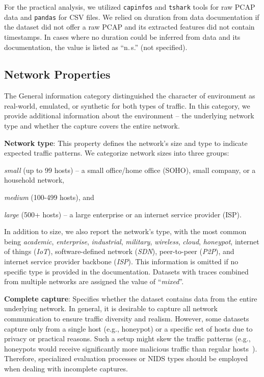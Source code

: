 For the practical analysis, we utilized \texttt{capinfos} and \texttt{tshark} tools for raw PCAP data and \texttt{pandas} for CSV files. We relied on duration from data documentation if the dataset did not offer a raw PCAP and its extracted features did not contain timestamps. In cases where no duration could be inferred from data and its documentation, the value is listed as ``n.\,s.'' (not specified).

\subsection{Network Properties}
\label{ssec:dprops_net_props}

The General information category distinguished the character of environment as real-world, emulated, or synthetic for both types of traffic. In this category, we provide additional information about the environment -- the underlying network type and whether the capture covers the entire network.

\textbf{Network type}: This property defines the network's size and type to indicate expected traffic patterns. We categorize network sizes into three groups:
\begin{enumerate*}[label={\arabic*)}]
    \item \emph{small} (up to 99 hosts) -- a small office/home office (SOHO), small company, or a household network,
    \item \emph{medium} (100-499 hosts), and
    \item \emph{large} (500+ hosts) -- a large enterprise or an internet service provider (ISP).
\end{enumerate*}
In addition to size, we also report the network's type, with the most common being \emph{academic}, \emph{enterprise}, \emph{industrial}, \emph{military}, \emph{wireless}, \emph{cloud}, \emph{honeypot}, internet of things (\emph{IoT}), software-defined network (\emph{SDN}), peer-to-peer (\emph{P2P}), and internet service provider backbone (\emph{ISP}). This information is omitted if no specific type is provided in the documentation. Datasets with traces combined from multiple networks are assigned the value of ``\emph{mixed}''.

\textbf{Complete capture}: Specifies whether the dataset contains data from the entire underlying network. In general, it is desirable to capture all network communication to ensure traffic diversity and realism. However, some datasets capture only from a single host (e.g., honeypot) or a specific set of hosts due to privacy or practical reasons. Such a setup might skew the traffic patterns (e.g., honeypots would receive significantly more malicious traffic than regular hosts~\cite{sethuraman2023_flowbased_honeypot}). Therefore, specialized evaluation processes or NIDS types should be employed when dealing with incomplete captures.

